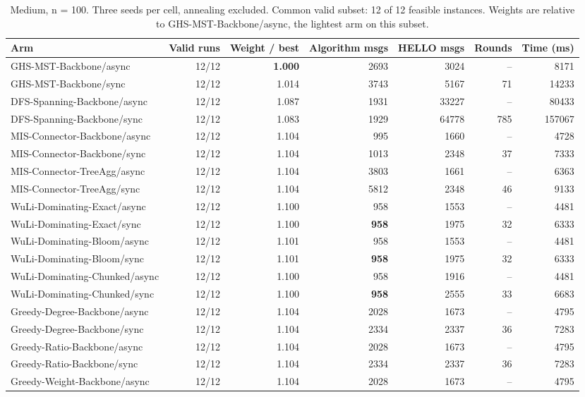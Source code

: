 \begin{table}[tb]
\centering
\caption{Medium, n = 100. Three seeds per cell, annealing excluded. Common valid subset: 12 of 12 feasible instances. Weights are relative to GHS-MST-Backbone/async, the lightest arm on this subset.}
\label{tab:cmp-sweep_medium_n100_fixed_v2}
\begin{tabular}{lrrrrrr}
\toprule
Arm & Valid runs & Weight / best & Algorithm msgs & HELLO msgs & Rounds & Time (ms) \\
\midrule
GHS-MST-Backbone/async & 12/12 & \textbf{1.000} & 2693 & 3024 & -- & 8171 \\
GHS-MST-Backbone/sync & 12/12 & 1.014 & 3743 & 5167 & 71 & 14233 \\
DFS-Spanning-Backbone/async & 12/12 & 1.087 & 1931 & 33227 & -- & 80433 \\
DFS-Spanning-Backbone/sync & 12/12 & 1.083 & 1929 & 64778 & 785 & 157067 \\
MIS-Connector-Backbone/async & 12/12 & 1.104 & 995 & 1660 & -- & 4728 \\
MIS-Connector-Backbone/sync & 12/12 & 1.104 & 1013 & 2348 & 37 & 7333 \\
MIS-Connector-TreeAgg/async & 12/12 & 1.104 & 3803 & 1661 & -- & 6363 \\
MIS-Connector-TreeAgg/sync & 12/12 & 1.104 & 5812 & 2348 & 46 & 9133 \\
WuLi-Dominating-Exact/async & 12/12 & 1.100 & 958 & 1553 & -- & 4481 \\
WuLi-Dominating-Exact/sync & 12/12 & 1.100 & \textbf{958} & 1975 & 32 & 6333 \\
WuLi-Dominating-Bloom/async & 12/12 & 1.101 & 958 & 1553 & -- & 4481 \\
WuLi-Dominating-Bloom/sync & 12/12 & 1.101 & \textbf{958} & 1975 & 32 & 6333 \\
WuLi-Dominating-Chunked/async & 12/12 & 1.100 & 958 & 1916 & -- & 4481 \\
WuLi-Dominating-Chunked/sync & 12/12 & 1.100 & \textbf{958} & 2555 & 33 & 6683 \\
Greedy-Degree-Backbone/async & 12/12 & 1.104 & 2028 & 1673 & -- & 4795 \\
Greedy-Degree-Backbone/sync & 12/12 & 1.104 & 2334 & 2337 & 36 & 7283 \\
Greedy-Ratio-Backbone/async & 12/12 & 1.104 & 2028 & 1673 & -- & 4795 \\
Greedy-Ratio-Backbone/sync & 12/12 & 1.104 & 2334 & 2337 & 36 & 7283 \\
Greedy-Weight-Backbone/async & 12/12 & 1.104 & 2028 & 1673 & -- & 4795 \\

\end{tabular}
\end{table}
